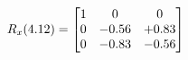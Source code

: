 \documentclass[preview]{standalone}
\begin{document}
\begin{align*}
\special{dvisvgm:raw <g id='unique000'>}R_{x}(4.12) = \begin{bmatrix}1 & 0 & 0 \\0 & -0.56 & +0.83 \\0 & -0.83 & -0.56\end{bmatrix}\special{dvisvgm:raw </g>}
\end{align*}
\end{document}
